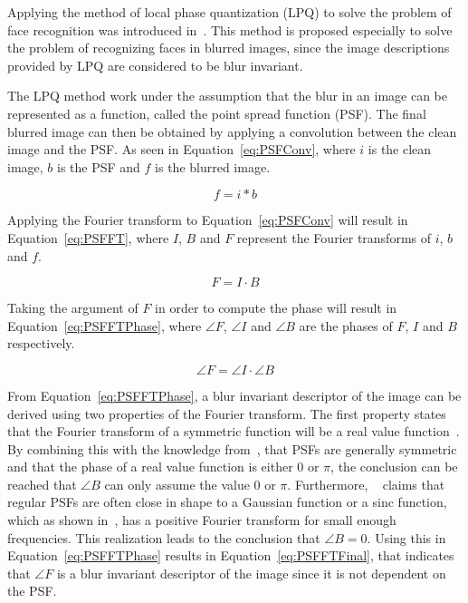 Applying the method of local phase quantization (LPQ) to solve the problem of face recognition was introduced in~\cite{LPQ:1996}. This method is proposed especially to solve the problem of recognizing faces in blurred images, since the image descriptions provided by LPQ are considered to be blur invariant.

The LPQ method work under the assumption that the blur in an image can be represented as a function, called the point spread function (PSF). The final blurred image can then be obtained by applying a convolution between the clean image and the PSF. As seen in Equation~\ref{eq:PSFConv}, where \(i\) is the clean image, \(b\) is the PSF and \(f\) is the blurred image.

\begin{equation}
  f = i \ast b
\label{eq:PSFConv}
\end{equation}

Applying the Fourier transform to Equation~\ref{eq:PSFConv} will result in Equation~\ref{eq:PSFFT}, where \(I\), \(B\) and \(F\) represent the Fourier transforms of \(i\), \(b\) and \(f\).

\begin{equation}
  F = I \cdot B
\label{eq:PSFFT}
\end{equation}

Taking the argument of \(F\) in order to compute the phase will result in Equation~\ref{eq:PSFFTPhase}, where \(\angle F\), \(\angle I\) and \(\angle B\) are the phases of \(F\), \(I\) and \(B\) respectively.

\begin{equation}
  \angle F = \angle I \cdot \angle B
\label{eq:PSFFTPhase}
\end{equation}

From Equation~\ref{eq:PSFFTPhase}, a blur invariant descriptor of the image can be derived using two properties of the Fourier transform. The first property states that the Fourier transform of a symmetric function will be a real value function~\cite[p. 151]{FandLTransforms}. By combining this with the knowledge from~\cite{PSFSymmetry}, that PSFs are generally symmetric and that the phase of a real value function is either \(0\) or \(\pi\), the conclusion can be reached that \(\angle B\) can only assume the value \(0\) or \(\pi\). Furthermore, ~\cite{LPQ:1996} claims that regular PSFs are often close in shape to a Gaussian function or a sinc function, which as shown in~\cite[p. 144-148]{FandLTransforms}, has a positive Fourier transform for small enough frequencies. This realization leads to the conclusion that \(\angle B = 0\). Using this in Equation~\ref{eq:PSFFTPhase} results in Equation~\ref{eq:PSFFTFinal}, that indicates that \(\angle F\) is a blur invariant descriptor of the image since it is not dependent on the PSF.

